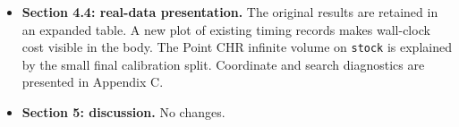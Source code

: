 \documentclass[10pt]{article}
\newcommand{\mssec}[1]{Section~\ref*{M-#1}}
\begin{document}
\begin{itemize}
\begin{enumerate}
\item \textbf{E02: Partial heteroskedasticity (\mssec{sec:absolute-residual-experiments}).}
Makes only five of ten coordinates input-dependent while preserving marginal second moments. 

\item \textbf{E03: Quantile regression experiments (\mssec{sec:cqr-experiments}).}
Tests quantile-regression residuals using capped transformation and adds the requested CQHR baseline. Outcome-space volumes and lengths show design-dependent gains of capped TSCP while identifying its inability to shrink the fitted base interval.
\end{enumerate}

\item \textbf{Section 4.4: real-data presentation.} The original results
are retained in an expanded table. A new plot of existing timing records
makes wall-clock cost visible in the body. The Point CHR infinite volume on \texttt{stock} is explained
by the small final calibration split. Coordinate and search diagnostics
are presented in Appendix C.

\item \textbf{Section 5: discussion.} No changes.
\end{itemize}
\end{document}
